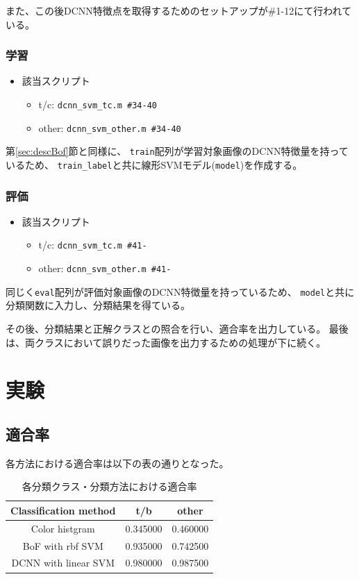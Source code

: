 \documentclass[11pt,a4paper, uplatex]{jsreport}
\begin{document}
また、この後DCNN特徴点を取得するためのセットアップが\#1-12にて行われている。
\subsubsection{学習}
\begin{itemize}
  \item 該当スクリプト
  \begin{itemize}
    \item t/c: \texttt{dcnn_svm_tc.m \#34-40}
    \item other: \texttt{dcnn_svm_other.m \#34-40}
  \end{itemize}
\end{itemize}
第\ref{sec:descBof}節と同様に、
\texttt{train}配列が学習対象画像のDCNN特徴量を持っているため、
\texttt{train_label}と共に線形SVMモデル(\texttt{model})を作成する。

\subsubsection{評価}
\begin{itemize}
  \item 該当スクリプト
  \begin{itemize}
    \item t/c: \texttt{dcnn_svm_tc.m \#41-}
    \item other: \texttt{dcnn_svm_other.m \#41-}
  \end{itemize}
\end{itemize}
同じく\texttt{eval}配列が評価対象画像のDCNN特徴量を持っているため、
\texttt{model}と共に分類関数に入力し、分類結果を得ている。

その後、分類結果と正解クラスとの照合を行い、適合率を出力している。
最後は、両クラスにおいて誤りだった画像を出力するための処理が下に続く。

\section{実験}
\subsection{適合率}
各方法における適合率は以下の表の通りとなった。
\begin{table}[h]
  \caption{各分類クラス・分類方法における適合率}
  \label{tb:accuracy}
  \begin{center}
    \begin{tabular}{ccc} \hline
      Classification method & t/b & other \\ \hline
      Color histgram & 0.345000 & 0.460000 \\
      BoF with rbf SVM & 0.935000 & 0.742500 \\
      DCNN with linear SVM & 0.980000 & 0.987500 \\ \hline
    \end{tabular}
  \end{center}
\end{table}
\end{document}
